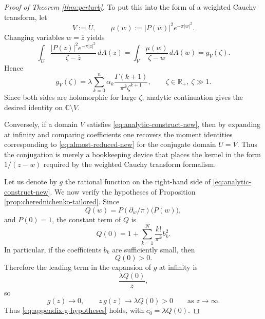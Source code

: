 \documentclass[a4paper,11pt,reqno]{amsart}
\numberwithin{equation}{section}
\theoremstyle{plain} %
\theoremstyle{definition} %
\theoremstyle{remark}
\newcommand{\R}{\mathbb{R}}
\newcommand{\C}{\mathbb{C}}
\begin{document}
\begin{proof}[Proof of Theorem \ref{thm:perturb}]
To put this into the form of a weighted Cauchy transform, let
\[
V:=\overline U,
\qquad
\mu(w):=|P(\overline w)|^2 e^{-\pi|w|^2}.
\]
Changing variables $w=\overline z$ yields
\[
\int_U \frac{|P(z)|^2e^{-\pi|z|^2}}{\zeta-\overline z}\,dA(z)
=
\int_V \frac{\mu(w)}{\zeta-w}\,dA(w)
=
g_V(\zeta).
\]
Hence
\begin{equation}\label{eq:analytic-construct-new}
g_V(\zeta)
=
\lambda \sum_{k=0}^n \alpha_k \frac{\Gamma(k+1)}{\pi^k \zeta^{k+1}},
\qquad \zeta\in \R_+, \ \zeta\gg 1.
\end{equation}
Since both sides are holomorphic for large $\zeta$, analytic continuation gives the desired identity on $\C\setminus V$.

Conversely, if a domain $V$ satisfies \eqref{eq:analytic-construct-new}, then by expanding at infinity and comparing coefficients one recovers the moment identities corresponding to \eqref{eq:almost-reduced-new} for the conjugate domain $U=\overline V$. Thus the conjugation is merely a bookkeeping device that places the kernel in the form \(1/(z-w)\) required by the weighted Cauchy transform formalism.

Let us denote by $g$ the rational function on the right-hand side of \eqref{eq:analytic-construct-new}. We now verify the hypotheses of Proposition \ref{prop:cherednichenko-tailored}. Since
\[
Q(w)=P(\partial_w/\pi)\big(P(w)\big),
\]
and $P(0)=1$, the constant term of $Q$ is
\[
Q(0)=1+\sum_{k=1}^N \frac{k!}{\pi^k} b_k^2.
\]
In particular, if the coefficients $b_k$ are sufficiently small, then
\[
Q(0)>0.
\]
Therefore the leading term in the expansion of $g$ at infinity is
\[
\frac{\lambda Q(0)}{z},
\]
so
\[
g(z)\to 0,
\qquad
z\,g(z)\to \lambda Q(0)>0
\qquad \text{as } z\to\infty.
\]
Thus \eqref{eq:appendix-g-hypotheses} holds, with \(c_0=\lambda Q(0)\).


\end{proof}
\end{document}
